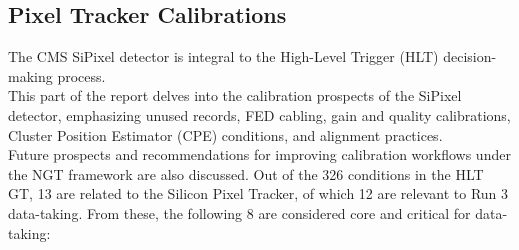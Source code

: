 \subsection{Pixel Tracker Calibrations}

The CMS SiPixel detector is integral to the High-Level Trigger (HLT) decision-making process.\\
This part of the report delves into the calibration prospects of the SiPixel detector, emphasizing unused records, FED cabling, gain and quality calibrations, Cluster Position Estimator (CPE) conditions, and alignment practices.\\
Future prospects and recommendations for improving calibration workflows under the NGT framework are also discussed.\newline \newline 
Out of the 326 conditions in the HLT GT, 13 are related to the Silicon Pixel Tracker, of which 12 are relevant to Run 3 data-taking. From these, the following 8 are considered core and critical for data-taking:

